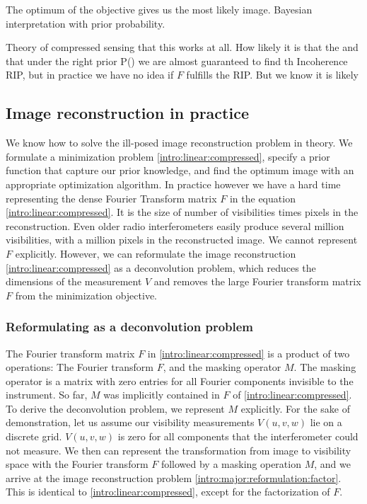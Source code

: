 The optimum of the objective gives us the most likely image. Bayesian interpretation with prior probability.




Theory of compressed sensing that this works at all. How likely it is that the and that under the right prior P() we are almost guaranteed to find th
Incoherence
RIP, but in practice we have no idea if $F$ fulfills the RIP. But we know it is likely


\subsection{Image reconstruction in practice}\label{intro:major}
We know how to solve the ill-posed image reconstruction problem in theory. We formulate a minimization problem \eqref{intro:linear:compressed}, specify a prior function that capture our prior knowledge, and find the optimum image with an appropriate optimization algorithm. In practice however we have a hard time representing the dense Fourier Transform matrix $F$ in the equation \eqref{intro:linear:compressed}. It is the size of number of visibilities times pixels in the reconstruction. Even older radio interferometers easily produce several million visibilities, with a million pixels in the reconstructed image. We cannot represent $F$ explicitly. However, we can reformulate the image reconstruction \eqref{intro:linear:compressed} as a deconvolution problem, which reduces the dimensions of the measurement $V$ and removes the large Fourier transform matrix $F$ from the minimization objective.

\subsubsection{Reformulating as a deconvolution problem}\label{intro:major:reformulation}
The Fourier transform matrix $F$ in \eqref{intro:linear:compressed} is a product of two operations: The Fourier transform $F$, and the masking operator $M$. The masking operator is a matrix with zero entries for all Fourier components invisible to the instrument. So far, $M$ was implicitly contained in $F$ of \eqref{intro:linear:compressed}. To derive the deconvolution problem, we represent $M$ explicitly. For the sake of demonstration, let us assume our visibility measurements $V(u, v ,w)$ lie on a discrete grid. $V(u, v, w)$ is zero for all components that the interferometer could not measure. We then can represent the transformation from image to visibility space with the Fourier transform $F$ followed by a masking operation $M$, and we arrive at the image reconstruction problem \eqref{intro:major:reformulation:factor}. This is identical to \eqref{intro:linear:compressed}, except for the factorization of $F$.

